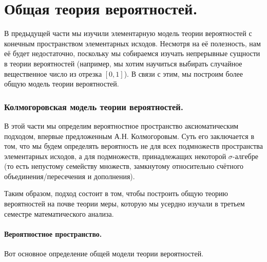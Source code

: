\documentclass[../main.tex]{subfiles}
\begin{document}
\newpage
\part{Общая теория вероятностей.}

В предыдущей части мы изучили элементарную модель теории вероятностей с конечным пространством элементарных исходов. Несмотря на её полезность, нам её будет недостаточно, поскольку мы собираемся изучать непрерывные сущности в теории вероятностей (например, мы хотим научиться выбирать случайное вещественное число из отрезка $ [0,1] $). В связи с этим, мы построим более общую модель теории вероятностей.

\section{Колмогоровская модель теории вероятностей.}

В этой части мы определим вероятностное пространство аксиоматическим подходом, впервые предложенным А.Н. Колмогоровым. Суть его заключается в том, что мы будем определять вероятность не для всех подмножеств пространства элементарных исходов, а для подмножеств, принадлежащих некоторой $ \sigma $-алгебре (то есть непустому семейству множеств, замкнутому относительно счётного объединения/пересечения и дополнения).

Таким образом, подход состоит в том, чтобы построить общую теорию вероятностей на почве теории меры, которую мы усердно изучали в третьем семестре математического анализа.

\subsection{Вероятностное пространство.}

Вот основное определение общей модели теории вероятностей.
\end{document}
